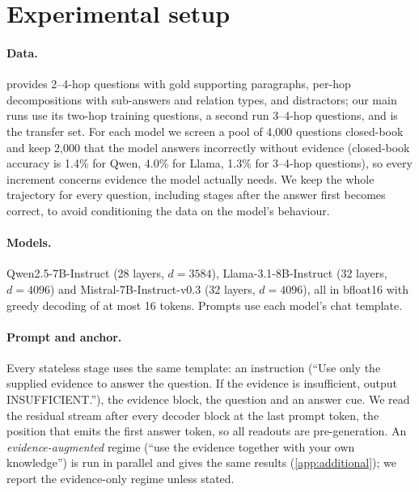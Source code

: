 \section{Experimental setup}
\label{sec:setup}

\paragraph{Data.}
\musique{} \citep{trivedi2022musique} provides 2--4-hop questions with gold supporting paragraphs, per-hop decompositions with sub-answers and relation types, and distractors; our main runs use its two-hop training questions, a second run 3--4-hop questions, and \twowiki{} \citep{ho2020constructing} is the transfer set. For each model we screen a pool of 4{,}000 questions closed-book and keep 2{,}000 that the model answers incorrectly without evidence (closed-book accuracy is 1.4\% for Qwen, 4.0\% for Llama, 1.3\% for 3--4-hop questions), so every increment concerns evidence the model actually needs. We keep the whole trajectory for every question, including stages after the answer first becomes correct, to avoid conditioning the data on the model's behaviour.

\paragraph{Models.}
Qwen2.5-7B-Instruct (28 layers, $d=3584$), Llama-3.1-8B-Instruct (32 layers, $d=4096$) and Mistral-7B-Instruct-v0.3 (32 layers, $d=4096$), all in bfloat16 with greedy decoding of at most 16 tokens. Prompts use each model's chat template.

\paragraph{Prompt and anchor.}
Every stateless stage uses the same template: an instruction (``Use only the supplied evidence to answer the question. If the evidence is insufficient, output INSUFFICIENT.''), the evidence block, the question and an answer cue. We read the residual stream after every decoder block at the last prompt token, the position that emits the first answer token, so all readouts are pre-generation. An \emph{evidence-augmented} regime (``use the evidence together with your own knowledge'') is run in parallel and gives the same results (\cref{app:additional}); we report the evidence-only regime unless stated.


